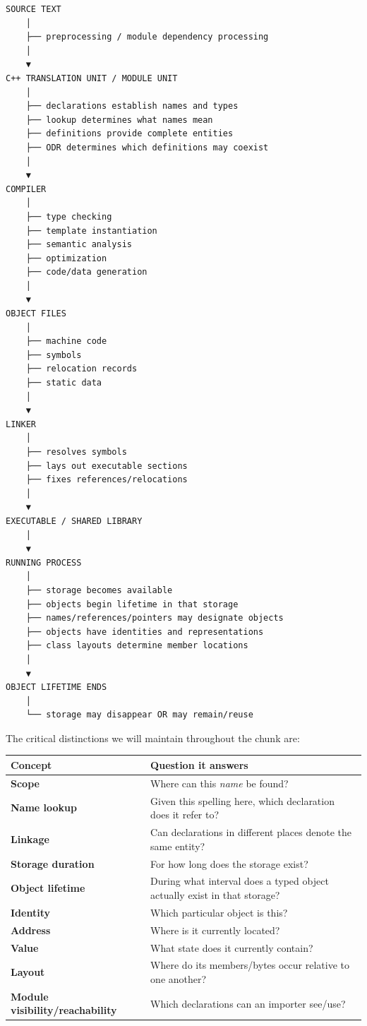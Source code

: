 \begin{verbatim}
SOURCE TEXT
    │
    ├── preprocessing / module dependency processing
    │
    ▼
C++ TRANSLATION UNIT / MODULE UNIT
    │
    ├── declarations establish names and types
    ├── lookup determines what names mean
    ├── definitions provide complete entities
    ├── ODR determines which definitions may coexist
    │
    ▼
COMPILER
    │
    ├── type checking
    ├── template instantiation
    ├── semantic analysis
    ├── optimization
    ├── code/data generation
    │
    ▼
OBJECT FILES
    │
    ├── machine code
    ├── symbols
    ├── relocation records
    ├── static data
    │
    ▼
LINKER
    │
    ├── resolves symbols
    ├── lays out executable sections
    ├── fixes references/relocations
    │
    ▼
EXECUTABLE / SHARED LIBRARY
    │
    ▼
RUNNING PROCESS
    │
    ├── storage becomes available
    ├── objects begin lifetime in that storage
    ├── names/references/pointers may designate objects
    ├── objects have identities and representations
    ├── class layouts determine member locations
    │
    ▼
OBJECT LIFETIME ENDS
    │
    └── storage may disappear OR may remain/reuse
\end{verbatim}

The critical distinctions we will maintain throughout the chunk are:

{\def\LTcaptype{none} %
\begin{longtable}[]{@{}
  >{\raggedright\arraybackslash}p{}
  >{\raggedright\arraybackslash}p{}@{}}
\toprule\noalign{}
\begin{minipage}[b]{\linewidth}\raggedright
Concept
\end{minipage} & \begin{minipage}[b]{\linewidth}\raggedright
Question it answers
\end{minipage} \\
\midrule\noalign{}
\endhead
\bottomrule\noalign{}
\endlastfoot
\textbf{Scope} & Where can this \emph{name} be found? \\
\textbf{Name lookup} & Given this spelling here, which declaration does it refer to? \\
\textbf{Linkage} & Can declarations in different places denote the same entity? \\
\textbf{Storage duration} & For how long does the storage exist? \\
\textbf{Object lifetime} & During what interval does a typed object actually exist in that storage? \\
\textbf{Identity} & Which particular object is this? \\
\textbf{Address} & Where is it currently located? \\
\textbf{Value} & What state does it currently contain? \\
\textbf{Layout} & Where do its members/bytes occur relative to one another? \\
\textbf{Module visibility/reachability} & Which declarations can an importer see/use? \\
\end{longtable}
}

